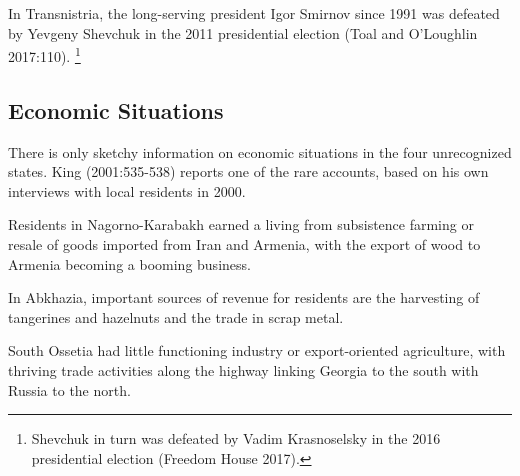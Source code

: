 \documentclass[12pt,a4paper]{article}%
\begin{document}
In Transnistria, the long-serving president Igor Smirnov since 1991 was defeated by Yevgeny Shevchuk in the 2011 presidential election (Toal and O'Loughlin 2017:110).%
\footnote{
	Shevchuk in turn was defeated by Vadim Krasnoselsky in the 2016 presidential election (Freedom House 2017).
	}



\subsection{Economic Situations}\label{economic}
There is only sketchy information on economic situations in the four unrecognized states. King (2001:535-538) reports one of the rare accounts, based on his own interviews with local residents in 2000. 

Residents in Nagorno-Karabakh earned a living from subsistence farming or resale of goods imported from Iran and Armenia, with the export of wood to Armenia becoming a booming business. 

In Abkhazia, important sources of revenue for residents are the harvesting of tangerines and hazelnuts and the trade in scrap metal. 

South Ossetia had little functioning industry or export-oriented agriculture, with thriving trade activities along the highway linking Georgia to the south with Russia to the north. 
\end{document}
